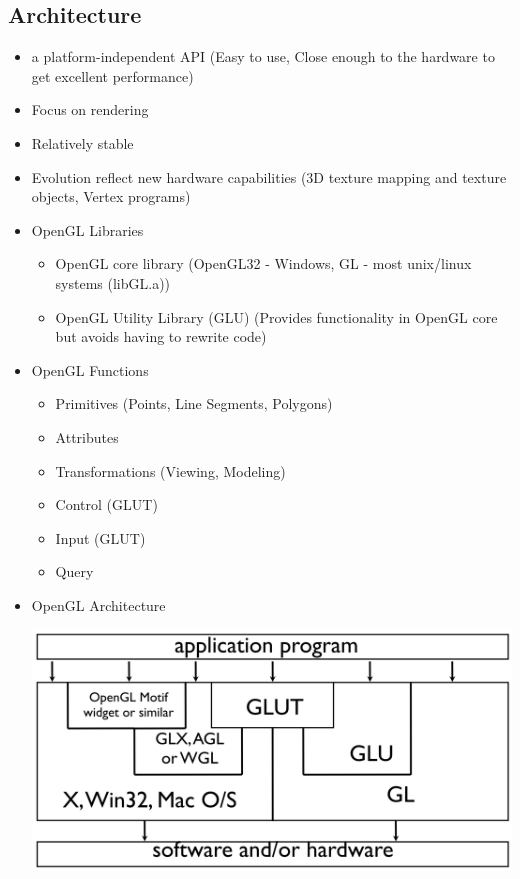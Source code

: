 \documentclass[11pt,a4paper]{article}
\begin{document}
	\subsection{Architecture}
		\begin{itemize}
			\item  a platform-independent API (Easy to use,  Close enough to the hardware to get excellent performance)
			\item  Focus on rendering
			\item Relatively stable
			\item Evolution reflect new hardware capabilities (3D texture mapping and texture objects, Vertex programs)
			\item OpenGL Libraries
				\begin{itemize}
					\item OpenGL core library (OpenGL32 - Windows,  GL - most unix/linux systems (libGL.a))
					\item OpenGL Utility Library (GLU) (Provides functionality in OpenGL core but avoids having to rewrite code)
				\end{itemize}
			\item OpenGL Functions
				\begin{itemize}
					\item Primitives (Points, Line Segments, Polygons)
					\item Attributes
					\item Transformations (Viewing, Modeling)
					\item Control (GLUT)
					\item  Input (GLUT)
					\item Query
				\end{itemize}
			\item OpenGL Architecture
			\begin{center}
				\includegraphics[scale=0.3]{pictures/pic2.jpg}
			\end{center}

\end{itemize}
\end{document}

